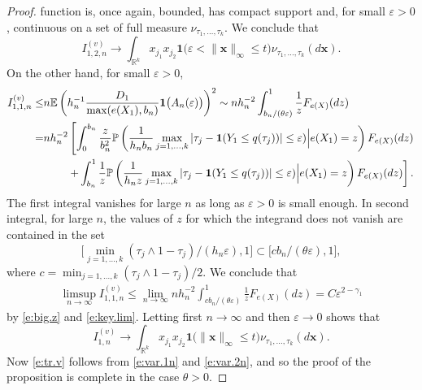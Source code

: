 \documentclass[12pt]{amsart}
\newcommand{\vep}{\varepsilon}
\newcommand{\bbr}{\mathbb{R}}
\newcommand{\LFe}{F_{e(X)}}
\newcommand{\1}{\mathbbm{1}}
\newcommand{\0}{\mathbf{0}}
\newcommand{\one}{\mathbf{1}}
\newcommand{\E}{\mathbb{E}}
\theoremstyle{plain}
\theoremstyle{definition}
\newcommand{\bbP}{\mathbb{P}}
\newcommand{\bx}{\mathbf{x}}
\begin{document}
\begin{proof}
function is, once again, bounded, has compact support  and, for small $\vep>0$, 
continuous on a set of full measure $\nu_{\tau_1,\ldots,\tau_k}$. We conclude that
$$
  I_{1,2,n}^{(v)} \to  \int_{\bbr^k} x_{j_1}x_{j_2}\one\bigl(\vep< \|\bx\|_\infty\leq t\bigr)
\nu_{\tau_1,\ldots, \tau_k}(d\bx).
$$
On the other hand, for small $\vep>0$, 
\begin{align*}
I_{1,1,n}^{(v)} \leq&n\E\left(h_n^{-1}\frac{D_1}{\max(e(X_1),b_n)}\one\bigl(
                               A_n(\vep)\bigr)\right)^2 
                      \sim  nh_n^{-2} \int_{b_n/(\theta\vep)}^1 \frac1z \LFe(dz) \\
 =& nh_n^{-2}\left[ \int_0^{b_n} \frac{z}{b_n^2} 
\bbP\left(  \frac{1}{h_nb_n} \max_{j=1,\ldots, k} |\tau_j-\one(Y_1\leq q(\tau_j))|\leq \vep)\Big|e(X_1)=z\right)F_{e(X)}(dz) \right. \\
 &\left. \hskip 0.3in + \int_{b_n}^{1} \frac{1}{z} 
\bbP\left(  \frac{1}{h_nz } \max_{j=1,\ldots, k} |\tau_j-\one(Y_1\leq q(\tau_j))|\leq \vep) \Big|e(X_1)=z\right)F_{e(X)}(dz)
 \right].
 \end{align*}
The first integral vanishes for large $n$ as long as $\vep>0$ is small enough. In second integral, for large $n$, the values of $z$ for which the integrand does not vanish are contained in the set
$$
\bigl[ \min_{j=1,\ldots, k} (\tau_j\wedge 1-\tau_j) /(h_n\vep), 1\bigr] \subset [cb_n/(\theta\vep),1\bigr],
$$
where $c=\min_{j=1,\ldots, k} (\tau_j\wedge 1-\tau_j)/2$. We conclude that 
 \begin{align*}                  
 \limsup _{n\to\infty}I_{1,1,n}^{(v)}  \leq 
 \lim_{n\to\infty} nh_n^{-2}\int_{cb_n/(\theta\vep)}^{1} \frac{1}{z} 
  F_{e(X)}(dz) = 
 C\vep^{2-\gamma_1}
  \end{align*}
  by \eqref{e:big.z} and \eqref{e:key.lim}.
  Letting first $n\to\infty$ and then $\vep\to 0$ shows that
  \begin{equation} \label{e:var.1n}
  I_{1,n}^{(v)} \to  \int_{\bbr^k} x_{j_1}x_{j_2}\one\bigl(\|\bx\|_\infty\leq t\bigr)
\nu_{\tau_1,\ldots, \tau_k}(d\bx).
\end{equation}
Now \eqref{e:tr.v} follows from \eqref{e:var.1n} and \eqref{e:var.2n},
and so the proof of the proposition is complete in the case
$\theta>0$.


\end{proof}
\end{document}
